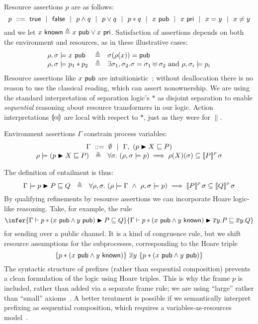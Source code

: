 \documentclass{entcs}
\begin{document}
Resource assertions $p$ are as follows:
\[
p\ ::=\
  \textsf{true} \ \ |\ \  \textsf{false} \ \ |\ \  p \wedge q \ \ |\ \  p \vee q \ \ |\ \  p * q \ \ |\ \ 
  x\ \textsf{pub} \ \ |\ \  x\ \textsf{pri} \ \ |\ \  x=y \ \ |\ \  x \neq y
\]
and we let $x\ \textsf{known} \triangleq x\ \textsf{pub} \vee x\ \textsf{pri}$.  Satisfaction of
assertions depends on both the environment and resources, as in these
illustrative cases:
\[
\begin{array}{lcl}
\rho, \sigma \models x \ \textsf{pub} &\triangleq& \sigma(\rho(x)) = \textsf{pub} \\
\rho, \sigma \models p_1 * p_2 &\triangleq& \exists \sigma_1,\sigma_2. \sigma = \sigma_1 \uplus \sigma_2 \textrm{ and } \rho, \sigma_i \models p_i
\end{array}
\]
Resource assertions like $x\ \textsf{pub}$ are
intuitionistic~\cite{Reynolds2002}; without deallocation there is no
reason to use the classical reading, which can assert nonownership.
We are using the standard interpretation of separation logic's $*$ as
disjoint separation to enable \emph{sequential} reasoning about
resource transformers in our logic.  Action interpretations
$\llparenthesis \alpha \rrparenthesis$ are local with respect to $*$, just as they were for
$\parallel$.

Environment assertions $\Gamma$ constrain process variables:
\[
\begin{array}{c}
\Gamma\ ::=\ \emptyset \ \ |\ \  \Gamma,\ (p \blacktriangleright X \sqsubseteq P)
\\
\rho \models (p \blacktriangleright X \sqsubseteq P) \ \ \triangleq\ \
\forall \sigma.\ (\rho, \sigma \models p) \implies 
  \rho(X)(\sigma) \subseteq \left\llbracket P \right\rrbracket^{\rho}{\sigma}
\end{array}
\]

The definition of entailment is thus:
\[
\Gamma \models p \blacktriangleright P \sqsubseteq Q\ \ \triangleq\ \
  \forall \rho, \sigma.\  
    (\rho \models \Gamma\ \wedge\
    \rho, \sigma \models p) \implies 
    \left\llbracket P \right\rrbracket^{\rho}\sigma \subseteq \left\llbracket Q \right\rrbracket^{\rho}\sigma
\]
By qualifying refinements by resource assertions we can incorporate
Hoare logic-like reasoning.  Take, for example, the rule
\[
\infer
  {\Gamma \gives p * (x\Pub \wedge y\Pub) \asm P \refines Q}
  {\Gamma \gives p * (x\Pub \wedge y\Known) \asm \ov{x}y.P \refines \ov{x}y.Q}
\]
for sending over a public channel.  It is a kind of congruence rule,
but we shift resource assumptions for the subprocesses, corresponding
to the Hoare triple
\[
  \{  p * (x\ \textsf{pub} \wedge y\ \textsf{known}) \}\ \overline{x}y\ \{ p * (x\ \textsf{pub} \wedge y\ \textsf{pub}) \}
\]
The syntactic structure of prefixes (rather than sequential
composition) prevents a clean formulation of the logic using Hoare
triples.  This is why the frame $p$ is included, rather than added via
a separate frame rule; we are using ``large'' rather than ``small''
axioms~\cite{OHearn2001}.  A better treatment is possible if we
semantically interpret prefixing as sequential composition, which
requires a variables-as-resources model~\cite{Parkinson}.
\end{document}
